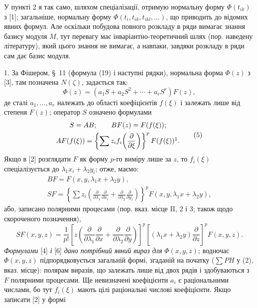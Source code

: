 \documentclass[11pt]{article}
\providecommand{\p}{\partial}
\begin{document}
У пункті 2 я так само, шляхом спеціалізації, отримую нормальну форму \(\Phi(t_{ik})\) з [1]; загальніше, нормальну форму \(\Phi(t_i,t_{ik},t_{ikl},\ldots)\), що приводить до відомих явних формул. Але оскільки побудова повного розкладу в ряди вимагає знання базису модуля \(M\), тут перевагу має інваріантно-теоретичний шлях (пор. наведену літературу), який цього знання не вимагає, а навпаки, завдяки розкладу в ряди сам дає базис модуля.

1. За Фішером, \S~11 (формула (19) і наступні рядки), нормальна форма \(\Phi(z)\) з [3], там позначена \(N(\zeta)\), задається так:
\begin{equation}
        \Phi(z)=(a_1S+a_2S^2+\cdots+a_rS^r)F(z),
\tag{4}
\end{equation}
де сталі \(a_1,\ldots,a_r\) належать до області коефіцієнтів \(f(\xi)\) і залежать лише від степеня \(F(z)\); оператор \(S\) означено формулами
\begin{equation}
\begin{gathered}
        S=AB;\qquad BF(z)=F(f(\xi));\\
        AF(f(\xi))=\left\{\sum z_i f_i\!\left(\frac{\p}{\p\xi}\right)\right\}^{p}F(f(\xi))\footnotemark.
\end{gathered}
\tag{5}
\end{equation}
Якщо в [2] розглядати \(F\) як форму \(p\)-го виміру лише за \(z\), то \(f_i(\xi)\) спеціалізується до \(\lambda_1x_i+\lambda_2y_i\); отже, маємо:
\[
\begin{gathered}
        BF=F(x,y,\lambda_1x+\lambda_2y),\\
        SF=\left\{\sum z_i\left(\frac{\p}{\p\lambda_1}\frac{\p}{\p x_i}+
        \frac{\p}{\p\lambda_2}\frac{\p}{\p y_i}\right)\right\}^{p}
        F(x,y,\lambda_1x+\lambda_2y),
\end{gathered}
\]
або, записано полярними процесами (пор. вказ. місце II, 2 і 3; також щодо скороченого позначення),
\begin{equation}
        SF(x,y,z)=\frac1{p!}\left[z\left(\frac{\p}{\p\lambda_1}\frac{\p}{\p x}+
        \frac{\p}{\p\lambda_2}\frac{\p}{\p y}\right)\right]^p
        \left[(\lambda_1x+\lambda_2y)\frac{\p}{\p z}\right]^p F(x,y,z).
\tag{6}
\end{equation}
\emph{Формулами} [4] \emph{і} [6] \emph{дано потрібний явний вираз для} \(\Phi(x,y,z)\); водночас \(\Phi(x,y,z)\) підпорядковується загальній формі, згаданій на початку (\(\sum PH\) у (2), вказ. місце): полярам виразів, що залежать лише від двох рядів і здобуваються з \(F\) полярними процесами. Ще невизначені коефіцієнти \(a_i\) є раціональними числами, бо тут \(f_i(\xi)\) мають цілі раціональні числові коефіцієнти. Якщо записати [2] у формі
\end{document}
